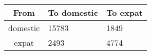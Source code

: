 \begin{tabular}{cll}
\hline \hline
 From &  To domestic & To expat \\
\hline

domestic & 15783 & 1849 \\ 
expat & 2493 & 4774 \\ 
\hline \hline
\end{tabular}
